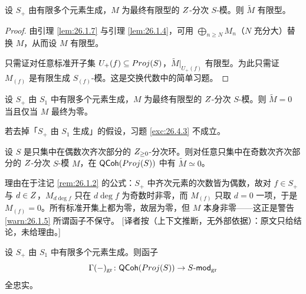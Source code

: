 \begin{lemma}\label{lem:26.4.2}
设 $S_+$ 由有限多个元素生成，$M$ 为最终有限型的 $Z$-分次 $S$-模。则 $\widetilde{M}$ 有限型。
\end{lemma}

\begin{proof}
由引理 \ref{lem:26.1.7} 与引理 \ref{lem:26.1.4}，可用 $\bigoplus_{n \ge N} M_n$（$N$ 充分大）替换 $M$，从而设 $M$ 有限型。

只需证对任意标准开子集 $U_+(f) \subseteq Proj(S)$，$\widetilde{M}|_{U_+(f)}$ 有限型。为此只需证 $M_{(f)}$ 是有限生成 $S_{(f)}$-模。这是交换代数中的简单习题。
\end{proof}

\begin{exercise}\label{exc:26.4.3}
设 $S_+$ 由 $S_1$ 中有限多个元素生成，$M$ 为最终有限型的 $Z$-分次 $S$-模。则 $\widetilde{M} = 0$ 当且仅当 $M$ 最终为零。
\end{exercise}

\begin{warning}\label{warn:26.4.4}
若去掉「$S_+$ 由 $S_1$ 生成」的假设，习题 \ref{exc:26.4.3} 不成立。
\end{warning}

\begin{example}\label{ex:26.4.5}
设 $S$ 是只集中在偶数次齐次部分的 $Z_{\ge 0}$-分次环。则对任意只集中在奇数次齐次部分的 $Z$-分次 $S$-模 $M$，在 $\mathsf{QCoh}(Proj(S))$ 中有 $\widetilde{M} \simeq 0$。
\end{example}

\begin{yizhu}
理由在于注记 \ref{rem:26.1.2} 的公式：$S_+$ 中齐次元素的次数皆为偶数，故对 $f \in S_+$ 与 $d \in Z$，$M_{d\deg f}$ 只在 $d\deg f$ 为奇数时非零，而 $M_{(f)}$ 只取 $d = 0$ 一项，于是 $M_{(f)} = 0$。所有标准开集上都为零，故层为零，但 $M$ 本身非零——这正是警告 \ref{warn:26.1.5} 所谓函子不保守。
[译者按（上下文推断，无外部依据）：原文只给结论，未给理由。]
\end{yizhu}

\begin{theorem}\label{thm:26.4.6}
设 $S_+$ 由 $S_1$ 中有限多个元素生成。则函子
\[
\Gamma(-)_{\mathrm{gr}} \colon \mathsf{QCoh}(Proj(S)) \to S\text{-}\mathsf{mod}_{\mathrm{gr}}
\]
全忠实。
\end{theorem}

